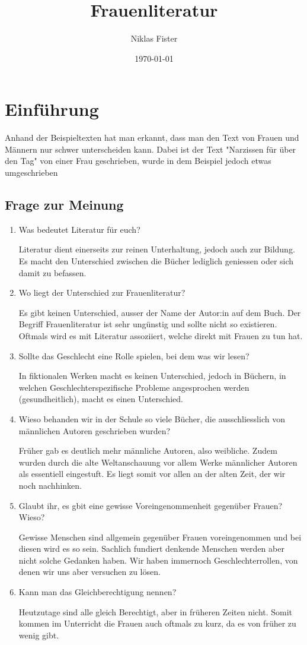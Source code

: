 \documentclass{article}
\title{\Huge\textbf{Frauenliteratur}}
\author{Niklas Fister}
\date{\today}
\begin{document}
\maketitle
\thispagestyle{empty}
\newpage

\section{Einführung}
Anhand der Beispieltexten hat man erkannt, dass man den Text von Frauen und Männern nur schwer unterscheiden kann.
Dabei ist der Text "Narzissen für über den Tag" von einer Frau geschrieben, wurde in dem Beispiel jedoch etwas umgeschrieben

\subsection{Frage zur Meinung}
\begin{enumerate}
    \item Was bedeutet Literatur für euch?

    Literatur dient einerseits zur reinen Unterhaltung, jedoch auch zur Bildung. Es macht den Unterschied zwischen die Bücher lediglich geniessen oder sich damit zu befassen.
    \item Wo liegt der Unterschied zur Frauenliteratur?

    Es gibt keinen Unterschied, ausser der Name der Autor:in auf dem Buch. Der Begriff Frauenliteratur ist sehr ungünstig und sollte nicht so existieren. Oftmals wird es mit Literatur assoziiert, welche direkt mit Frauen zu tun hat.
    \item Sollte das Geschlecht eine Rolle spielen, bei dem was wir lesen?

    In fiktionalen Werken macht es keinen Unterschied, jedoch in Büchern, in welchen Geschlechterspezifische Probleme angesprochen werden (gesundheitlich), macht es einen Unterschied.
    \item Wieso behanden wir in der Schule so viele Bücher, die ausschliesslich von männlichen Autoren geschrieben wurden?

    Früher gab es deutlich mehr männliche Autoren, also weibliche. Zudem wurden durch die alte Weltanschauung vor allem Werke männlicher Autoren als essentiell eingestuft. Es liegt somit vor allen an der alten Zeit, der wir noch nachhinken.
    \item Glaubt ihr, es gbit eine gewisse Voreingenommenheit gegenüber Frauen? Wieso?

    Gewisse Menschen sind allgemein gegenüber Frauen voreingenommen und bei diesen wird es so sein. Sachlich fundiert denkende Menschen werden aber nicht solche Gedanken haben. Wir haben immernoch Geschlechterrollen, von denen wir uns aber versuchen zu lösen.
    \item Kann man das Gleichberechtigung nennen?

    Heutzutage sind alle gleich Berechtigt, aber in früheren Zeiten nicht. Somit kommen im Unterricht die Frauen auch oftmals zu kurz, da es von früher zu wenig gibt.
\end{enumerate}
\end{document}
